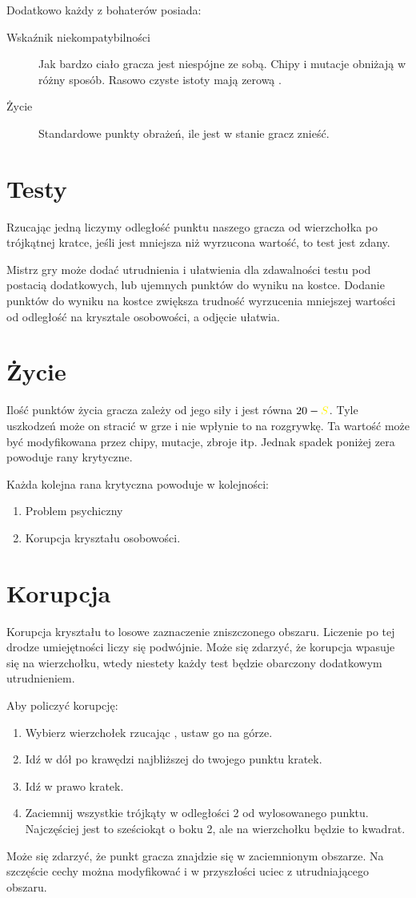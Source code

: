 Dodatkowo każdy z bohaterów posiada:
\begin{description}
 \item [Wskaźnik niekompatybilności \abnkp] Jak bardzo ciało gracza jest niespójne ze sobą. Chipy i mutacje obniżają \abnkp w różny sposób. Rasowo czyste istoty mają zerową \abnkp.
 \item [Życie \abzyc] Standardowe punkty obrażeń, ile jest w stanie gracz znieść.
\end{description}

\section{Testy}
Rzucając jedną \dxx liczymy odległość punktu naszego gracza od wierzchołka po trójkątnej kratce, jeśli jest mniejsza niż wyrzucona wartość, to test jest zdany.

Mistrz gry może dodać utrudnienia i ułatwienia dla zdawalności testu pod postacią dodatkowych, lub ujemnych punktów do wyniku na kostce.
Dodanie punktów do wyniku na kostce zwiększa trudność wyrzucenia mniejszej wartości od odległość na krysztale osobowości, a odjęcie ułatwia.

\section{Życie}
Ilość punktów życia gracza zależy od jego siły i jest równa $20 - \abs$.
Tyle uszkodzeń może on stracić w grze i nie wpłynie to na rozgrywkę.
Ta wartość może być modyfikowana przez chipy, mutacje, zbroje itp.
Jednak spadek poniżej zera powoduje rany krytyczne.

Każda kolejna rana krytyczna powoduje w kolejności:
\begin{enumerate}
\item Problem psychiczny
\item Korupcja kryształu osobowości.
\end{enumerate}

\section{Korupcja}
Korupcja kryształu to losowe zaznaczenie zniszczonego obszaru.
Liczenie po tej drodze umiejętności liczy się podwójnie.
Może się zdarzyć, że korupcja wpasuje się na wierzchołku, wtedy niestety każdy test będzie obarczony dodatkowym utrudnieniem.

Aby policzyć korupcję:
\begin{enumerate}
 \item Wybierz wierzchołek rzucając \dvi, ustaw go na górze.
 \item Idź w dół po krawędzi najbliższej do twojego punktu \dxx kratek.
 \item Idź w prawo \dxx[2] kratek.
 \item Zaciemnij wszystkie trójkąty w odległości 2 od wylosowanego punktu. Najczęściej jest to sześciokąt o boku 2, ale na wierzchołku będzie to kwadrat.
\end{enumerate}
Może się zdarzyć, że punkt gracza znajdzie się w zaciemnionym obszarze. 
Na szczęście cechy można modyfikować i w przyszłości uciec z utrudniającego obszaru.

